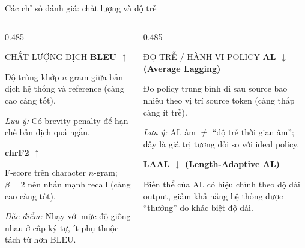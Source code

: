 \documentclass[aspectratio=169,11pt]{beamer}
\begin{document}
\begin{frame}{Các chỉ số đánh giá: chất lượng và độ trễ}
  \begin{columns}[T,onlytextwidth]
    \begin{column}{0.485\textwidth}
      \begin{block}{CHẤT LƯỢNG DỊCH}
        \scriptsize
        \textbf{\normalsize BLEU $\uparrow$}\par
        \vspace{0.1em}
        Độ trùng khớp $n$-gram giữa bản dịch hệ thống và reference (càng cao càng tốt).\par
        \vspace{0.15em}
        \textit{Lưu ý:} Có brevity penalty để hạn chế bản dịch quá ngắn.

        \vspace{0.45em}
        \textbf{\normalsize chrF2 $\uparrow$}\par
        \vspace{0.1em}
        F-score trên character $n$-gram; $\beta = 2$ nên nhấn mạnh recall (càng cao càng tốt).\par
        \vspace{0.15em}
        \textit{Đặc điểm:} Nhạy với mức độ giống nhau ở cấp ký tự, ít phụ thuộc tách từ hơn BLEU.
      \end{block}
    \end{column}
    \begin{column}{0.485\textwidth}
      \begin{block}{ĐỘ TRỄ / HÀNH VI POLICY}
        \scriptsize
        \textbf{\normalsize AL $\downarrow$ \textnormal{(Average Lagging)}}\par
        \vspace{0.1em}
        Đo policy trung bình đi sau source bao nhiêu theo vị trí source token (càng thấp càng ít trễ).\par
        \vspace{0.15em}
        \textit{Lưu ý:} AL âm $\neq$ ``độ trễ thời gian âm''; đây là giá trị tương đối so với ideal policy.

        \vspace{0.35em}
        \textbf{\normalsize LAAL $\downarrow$ \textnormal{(Length-Adaptive AL)}}\par
        \vspace{0.1em}
        Biến thể của AL có hiệu chỉnh theo độ dài output, giảm khả năng hệ thống được ``thưởng'' do khác biệt độ dài.


\end{block}
\end{column}
\end{columns}
\end{frame}
\end{document}
